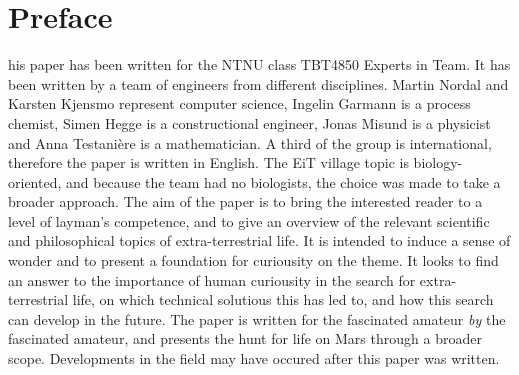\section*{Preface}
his paper has been written for the NTNU class TBT4850 Experts in Team.
It has been written by a team of engineers from different disciplines.
Martin Nordal and Karsten Kjensmo represent computer science, Ingelin Garmann is a process chemist, Simen Hegge is a constructional engineer, Jonas Misund is a physicist and Anna Testani\`{e}re is a mathematician.
A third of the group is international, therefore the paper is written in English. 
The EiT village topic is biology-oriented, and because the team had no biologists, the choice was made to take a broader approach. 
The aim of the paper is to bring the interested reader to a level of layman's competence, and to give an overview of the relevant scientific and philosophical topics of extra-terrestrial life.
It is intended to induce a sense of wonder and to present a foundation for curiousity on the theme. It looks to find an answer to the importance of human curiousity in the search for extra-terrestrial life, on which technical solutious this has led to, and how this search can develop in the future.  
The paper is written for the fascinated amateur \emph{by} the fascinated amateur, and presents the hunt for life on Mars through a broader scope. 
Developments in the field may have occured after this paper was written. 
